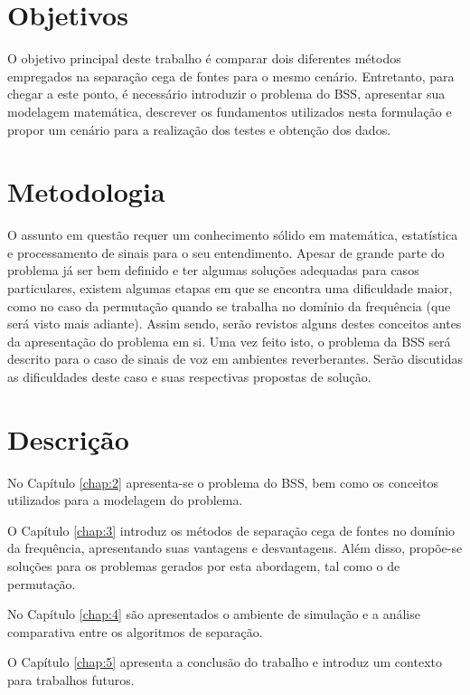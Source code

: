 \section{Objetivos}

O objetivo principal deste trabalho é comparar dois diferentes métodos empregados na separação cega de fontes para o mesmo cenário. Entretanto, para chegar a este ponto, é necessário introduzir o problema do BSS, apresentar sua modelagem matemática, descrever os fundamentos utilizados nesta formulação e propor um cenário para a realização dos testes e obtenção dos dados.


\section{Metodologia}

O assunto em questão requer um conhecimento sólido em matemática, estatística e processamento de sinais para o seu entendimento. Apesar de grande parte do problema já ser bem definido e ter algumas soluções adequadas para casos particulares, existem algumas etapas em que se encontra uma dificuldade maior, como no caso da permutação quando se trabalha no domínio da frequência (que será visto mais adiante). Assim sendo, serão revistos alguns destes conceitos antes da apresentação do problema em si. Uma vez feito isto, o problema da BSS será descrito para o caso de sinais de voz em ambientes reverberantes. Serão discutidas as dificuldades deste caso e suas respectivas propostas de solução.


\section{Descrição}

No Capítulo \ref{chap:2} apresenta-se o problema do BSS, bem como os conceitos utilizados para a modelagem do problema.

O Capítulo \ref{chap:3} introduz os métodos de separação cega de fontes no domínio da frequência, apresentando suas vantagens e desvantagens. Além disso, propõe-se soluções para os problemas gerados por esta abordagem, tal como o de permutação.

No Capítulo \ref{chap:4} são apresentados o ambiente de simulação e a análise comparativa entre os algoritmos de separação.

O Capítulo \ref{chap:5} apresenta a conclusão do trabalho e introduz um contexto para trabalhos futuros.

